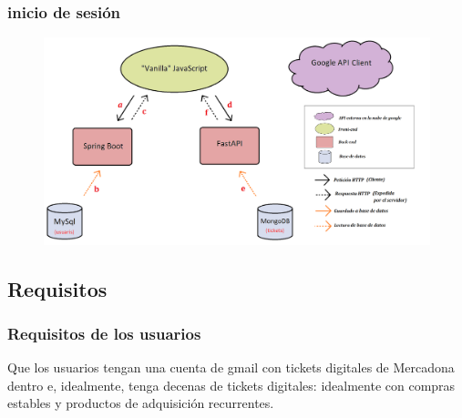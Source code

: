 \documentclass{beamer}
\begin{document}
			
			\begin{frame}
				\frametitle{inicio de sesión}
				
				\begin{figure}
					\centering
					\includegraphics[width=1\linewidth]{../img/diagramaSistemesAplicacioMercappCAMIINICISESSIO}
					
					\label{fig:diagramasistemesaplicaciomercappcamiinicisessio}
				\end{figure}
				
			\end{frame}
			
			
			

			
			\subsection{Requisitos}
			\begin{frame}
				\frametitle{Requisitos de los usuarios}
				
			
				Que los usuarios tengan una cuenta de gmail con tickets digitales de Mercadona dentro e, idealmente, tenga decenas de tickets digitales: idealmente con compras estables y productos de adquisición recurrentes.
	

				
				
			\end{frame}
			
	
		

		
		
\end{document}
